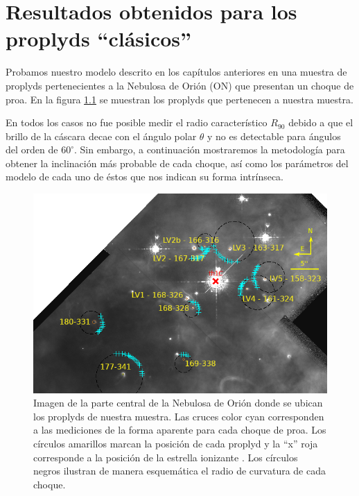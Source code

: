 \chapter[Resultados Obtenidos]{Resultados obtenidos para los proplyds ``clásicos''}
\label{chap:proplyds}
\thispagestyle{empty}
Probamos nuestro modelo descrito en los capítulos anteriores en una muestra de proplyds pertenecientes a la Nebulosa de Orión (ON) que presentan un choque de proa. En la figura \ref{fig:proplyds-map} se muestran los proplyds que pertenecen a nuestra muestra. 

En todos los casos no fue posible medir el radio característico $R_{90}$ debido a que el brillo de la cáscara decae con el ángulo polar $\theta$ y no es detectable para ángulos del orden de $60^\circ$. Sin embargo, a continuación mostraremos la metodología para obtener la inclinación más probable de cada choque, así como los parámetros del modelo de cada uno de éstos que nos indican su forma intrínseca.

\begin{figure}
  \centering
    \includegraphics[width=\linewidth]{./Figures/Trapezium-annotate-rob-2018}
    \caption[Imagen de la parte central de la Nebulosa de Orión donde se ubican los proplyds de nuestra muestra.]{Imagen de la parte central de la Nebulosa de Orión donde se ubican los proplyds de nuestra muestra. Las cruces color cyan corresponden a las mediciones de la forma aparente para cada choque de proa. Los círculos amarillos marcan la posición de cada proplyd y la ``x'' roja corresponde a la posición de la estrella ionizante \thC{}. Los círculos negros ilustran de manera esquemática el radio de curvatura de cada choque.}
    \label{fig:proplyds-map}
\end{figure}

